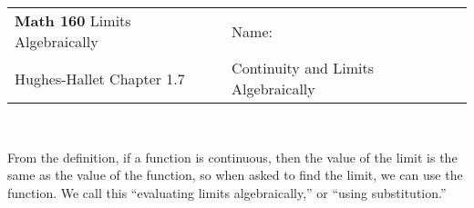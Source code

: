 \documentclass[12pt]{report}
\begin{document}
\begin{tabular*}{\textwidth}{@{\extracolsep{\fill}}ll}
\textbf{Math 160} Limits Algebraically & \;\;Name: \hrulefill \\
 Hughes-Hallet Chapter 1.7& Continuity and Limits Algebraically\hspace{1in}  \\
\hline\hline
\end{tabular*} \\






From the definition, if a function is continuous, then the value of the limit is the same as the value of the function, so when asked to find the limit, we can use the function. We call this ``evaluating limits algebraically,'' or ``using substitution.''\\
\end{document}
